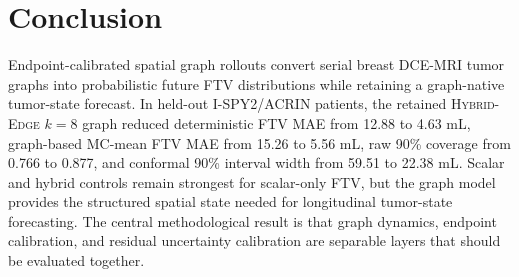 \documentclass[journal,twoside,print]{ieeecolor}
\newcommand{\modeltag}{\textsc{Hybrid-Edge} $k=8$}
\begin{document}
\section{Conclusion}
\label{sec:conclusion}

Endpoint-calibrated spatial graph rollouts convert serial breast DCE-MRI tumor
graphs into probabilistic future FTV distributions while retaining a
graph-native tumor-state forecast. In held-out I-SPY2/ACRIN patients, the
retained \modeltag{} graph reduced deterministic FTV MAE from 12.88 to
4.63 mL, graph-based MC-mean FTV MAE from 15.26 to 5.56 mL, raw 90\% coverage
from 0.766 to 0.877, and conformal 90\% interval width from 59.51 to
22.38 mL. Scalar and hybrid controls remain strongest for scalar-only FTV, but
the graph model provides the structured spatial state needed for longitudinal
tumor-state forecasting. The central methodological result is that graph
dynamics, endpoint calibration, and residual uncertainty calibration are
separable layers that should be evaluated together.



\end{document}
